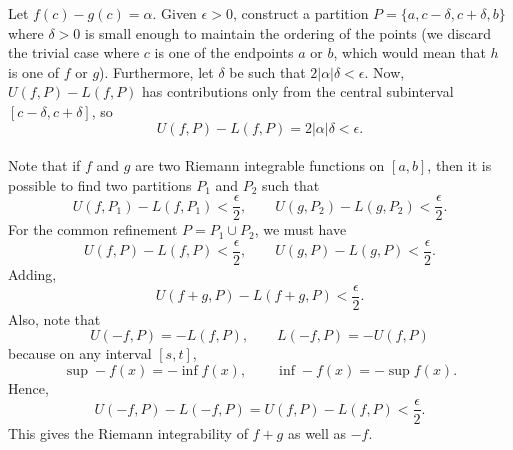 \documentclass[10pt]{article}
\begin{document}
    Let $f(c) - g(c) = \alpha$. Given $\epsilon > 0$, construct a partition $P =
    \{a, c - \delta, c + \delta, b\}$ where $\delta > 0$ is small enough to maintain the
    ordering of the points (we discard the trivial case where $c$ is one of the
    endpoints $a$ or $b$, which would mean that $h$ is one of $f$ or $g$).
    Furthermore, let $\delta$ be such that $2|\alpha|\delta < \epsilon$.
    Now, $U(f, P) - L(f, P)$ has contributions only from the central subinterval
    $[c - \delta, c + \delta]$, so \[
        U(f, P) - L(f, P) = 2|\alpha|\delta < \epsilon.
    \] \\

    Note that if $f$ and $g$ are two Riemann integrable functions on $[a, b]$, then
    it is possible to find two partitions $P_1$ and $P_2$ such that \[
        U(f, P_1) - L(f, P_1) < \frac{\epsilon}{2}, \qquad U(g, P_2) - L(g, P_2) <
        \frac{\epsilon}{2}.
    \] For the common refinement $P = P_1 \cup P_2$, we must have \[
        U(f, P) - L(f, P) < \frac{\epsilon}{2}, \qquad U(g, P) - L(g, P) <
        \frac{\epsilon}{2}.
    \] Adding, \[
        U(f + g, P) - L(f + g, P) < \frac{\epsilon}{2}.
    \] Also, note that \[
        U(-f, P) = -L(f, P), \qquad L(-f, P) = -U(f, P)
    \] because on any interval $[s, t]$, \[
        \sup -f(x) = - \inf f(x), \qquad \inf -f(x) = -\sup f(x).
    \] Hence, \[
        U(-f, P) - L(-f, P) = U(f, P) - L(f, P) < \frac{\epsilon}{2}.
    \] This gives the Riemann integrability of $f + g$ as well as $-f$.
\end{document}
